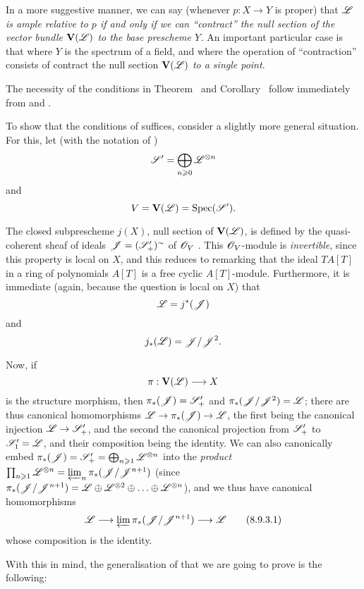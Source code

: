 In a more suggestive manner, we can say (whenever $p:X\to Y$ is proper) that \emph{$\mathscr{L}$ is ample relative to $p$ if and only if we can ``\emph{contract}'' the null section of the vector bundle $\mathbf{V}(\mathscr{L})$ to the base prescheme $Y$.}
An important particular case is that where $Y$ is the spectrum of a field, and where the operation of ``contraction'' consists of contract the null section $\mathbf{V}(\mathscr{L})$ \emph{to a single point}.

\begin{env}[8.9.3]
\label{II.8.9.3}
The necessity of the conditions in Theorem~ and Corollary~ follow immediately from  and .

To show that the conditions of  suffices, consider a slightly more general situation.
For this, let (with the notation of )
\[
  \mathscr{S}'=\bigoplus_{n\geqslant0}\mathscr{L}^{\otimes n}
\]
and
\[
  V=\mathbf{V}(\mathscr{L})=\operatorname{Spec}(\mathscr{S}').
\]

The closed subprescheme $j(X)$, null section of $\mathbf{V}(\mathscr{L})$, is defined by the quasi-coherent sheaf of ideals $\mathscr{J}=(\mathscr{S}'_+)^\sim$ of $\mathscr{O}_V$ .
This $\mathscr{O}_V$-module is \emph{invertible}, since this property is local on $X$, and this reduces to remarking that the ideal $TA[T]$ in a ring of polynomials $A[T]$ is a free cyclic $A[T]$-module.
Furthermore, it is immediate (again, because the question is local on $X$) that
\[
  \mathscr{L}=j^*(\mathscr{J})
\]
and
\[
  j_*(\mathscr{L})=\mathscr{J}/\mathscr{J}^2.
\]

Now, if
\[
  \pi:\bb{V}(\sh{L})\to X
\]
is the structure morphism, then $\pi_*(\mathscr{J})=\mathscr{S}'_+$ and $\pi_*(\mathscr{J}/\mathscr{J}^2)=\mathscr{L}$;
there are thus canonical homomorphisms $\sh{L}\to\pi_*(\sh{J})\to\sh{L}$, the first being the canonical injection $\sh{L}\to\sh{S}'_+$, and the second the canonical projection from $\mathscr{S}'_+$ to $\mathscr{S}'_1=\mathscr{L}$, and their composition being the identity.
We can also canonically embed $\pi_*(\mathscr{J}) = \mathscr{S}'_+ = \bigoplus_{n\geqslant1}\mathscr{L}^{\otimes n}$ into the \emph{product} $\prod_{n\geqslant1}\mathscr{L}^{\otimes n} = \varprojlim_n \pi_*(\mathscr{J}/\mathscr{J}^{n+1})$ (since $\pi_*(\mathscr{J}/\mathscr{J}^{n+1}) = \mathscr{L}\oplus\mathscr{L}^{\otimes 2}\oplus\ldots\oplus\mathscr{L}^{\otimes n}$), and we thus have canonical homomorphisms
\[
\label{II.8.9.3.1}
  \sh{L}\to\varprojlim\pi_*(\sh{J}/\sh{J}^{n+1})\to\sh{L}
  \tag{8.9.3.1}
\]
whose composition is the identity.

With this in mind, the generalisation of  that we are going to prove is the following:
\end{env}

